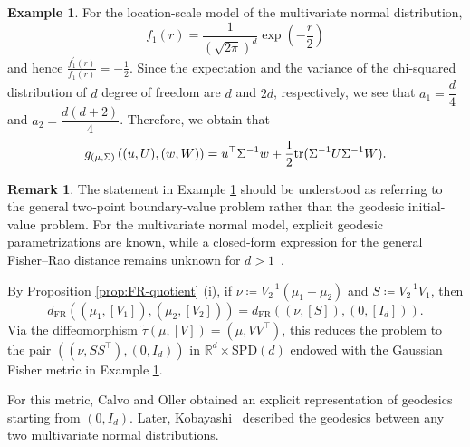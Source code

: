 \documentclass[a4paper, reqno, 11pt]{article}
\theoremstyle{definition}
\newtheorem{Rem}[Thm]{Remark}
\newtheorem{Exa}[Thm]{Example}
\def\SPD{\mathrm{SPD}}
\def\FR{{\mathrm{FR}}}
\begin{document}
\begin{Exa}\label{exa:FR-Gaussian}
For the location-scale model of the multivariate normal distribution, 
$$f_1 (r) = \frac{1}{(\sqrt{2\pi})^d} \exp\left(- \frac{r}{2} \right)$$ and hence $\displaystyle \frac{f_1^{\prime} (r)}{f_1 (r)} = -\frac{1}{2}$. 
Since the expectation and the variance of the chi-squared distribution of $d$ degree of freedom  are $d$ and $2d$, respectively, 
we see that $a_1 = \dfrac{d}{4}$ and $a_2 = \dfrac{d(d+2)}{4}$. 
Therefore, we obtain that 
\[ g_{(\mu, \Sigma)} \left( (u,U), (w,W)\right)  = u^{\top} \Sigma^{-1} w + \frac{1}{2} \textup{tr}(\Sigma^{-1}U\Sigma^{-1}W). \]
\end{Exa}

\begin{Rem}
The statement in Example \ref{exa:FR-Gaussian} should be understood as referring to the general two-point boundary-value problem rather than the geodesic initial-value problem. 
For the multivariate normal model,
explicit geodesic parametrizations are known, 
while a closed-form expression for the general Fisher--Rao distance remains unknown for  $d>1$~\cite{pinele2020fisher,nielsen2024approximation}. 

By Proposition \ref{prop:FR-quotient} (i), 
if $\nu \coloneqq V_2^{-1}(\mu_1-\mu_2)$ and $S\coloneqq V_2^{-1}V_1$,
then
\[ d_{\FR}\left((\mu_1,[V_1]),(\mu_2,[V_2])\right) = d_{\FR}\left((\nu,[S]),(0,[I_d])\right). \]
Via the diffeomorphism
$\tilde\tau(\mu,[V]) = \left(\mu,VV^\top \right)$,
this reduces the problem to the pair
$ \left((\nu,SS^\top),(0,I_{d})\right)$ in $\mathbb{R}^d \times \SPD(d)$ endowed with the Gaussian Fisher metric in
Example \ref{exa:FR-Gaussian}.

For this metric, Calvo and Oller \cite[Theorem 3.1 and Section 4]{calvo1991explicit} obtained an explicit representation of geodesics starting from $(0,I_d)$. 
Later, Kobayashi~\cite{kobayashi2023geodesics} described the geodesics between any two multivariate normal distributions.
\end{Rem}
\end{document}
